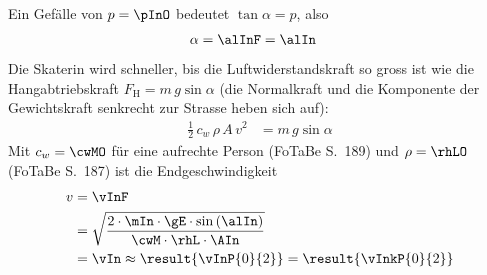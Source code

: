 \begin{center}
\end{center}

Ein Gefälle von $p = \pInO$ bedeutet $\tan\alpha = p$, also
\begin{align}
 \alpha &= \alInF = \alIn
\end{align}
Die Skaterin wird schneller, bis die Luftwiderstandskraft so gross ist wie die Hangabtriebskraft $F_\text{H} = m\,g\sin\alpha$ (die Normalkraft und die Komponente der Gewichtskraft senkrecht zur Strasse heben sich auf):
\begin{align}
 \frac{1}{2}\,c_w\,\rho\,A\,v^2 &= m\,g\sin\alpha
\end{align}
Mit $c_w = \cwMO$ für eine aufrechte Person (FoTaBe S.~189) und $\rho = \rhLO$ (FoTaBe S.~187) ist die Endgeschwindigkeit
\begin{align}
 v &= \vInF \\
   &= \sqrt{\frac{2\cdot\mIn\cdot\gE\cdot\sin\left(\alIn\right)}{\cwM\cdot\rhL\cdot\AIn}} \\
   &= \vIn \approx \result{\vInP{0}{2}} = \result{\vInkP{0}{2}}
\end{align}
